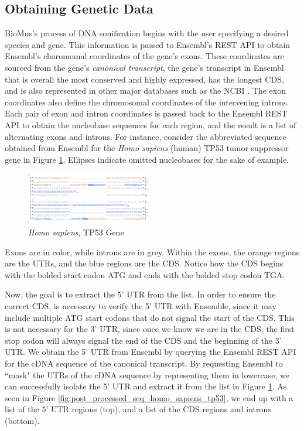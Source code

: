 \documentclass[letterpaper]{article}
\begin{document}
\subsection{Obtaining Genetic Data}
BioMus's process of DNA sonification begins with the user specifying a desired species and gene. This information is passed to Ensembl's REST API to obtain Ensembl's choromomal coordinates of the gene's exons. These coordinates are sourced from the gene's \textit{canonical transcript}, the gene's transcript in Ensembl that is overall the most conserved and highly expressed, has the longest CDS, and is also represented in other major databases such as the NCBI \cite{ensembl_transcript_flags}. The exon coordinates also define the chromosomal coordinates of the intervening introns. Each pair of exon and intron coordinates is passed back to the Ensembl REST API to obtain the nucleobase sequences for each region, and the result is a list of alternating exons and introns. For instance, consider the abbreviated sequence obtained from Ensembl for the \textit{Homo sapiens} (human) TP53 tumor suppressor gene in Figure \ref{fig:pre_processed_seq_homo_sapiens_tp53}. Ellipses indicate omitted nucleobases for the sake of example.

\begin{figure}[h!]
\centering
\includegraphics[width=0.48\textwidth]{images/pre_processed_seq_homo_sapiens_tp53_ABBREV}
  \caption{\textit{Homo sapiens}, TP53 Gene}\label{fig:pre_processed_seq_homo_sapiens_tp53}
  \vspace{-3mm}
\end{figure}

Exons are in color, while introns are in grey. Within the exons, the orange regions are the UTRs, and the blue regions are the CDS. Notice how the CDS begins with the bolded start codon ATG and ends with the bolded stop codon TGA. 

Now, the goal is to extract the 5' UTR from the list. In order to ensure the correct CDS, is necessary to verify the 5' UTR with Ensemble, since it may include multiple ATG start codons that do not signal the start of the CDS. This is not necessary for the 3' UTR, since once we know we are in the CDS, the first stop codon will always signal the end of the CDS and the beginning of the 3' UTR. We obtain the 5' UTR from Ensembl by querying the Ensembl REST API for the cDNA sequence of the canonical transcript. By requesting Ensembl to ``mask" the UTRs of the cDNA sequence by representing them in lowercase, we can successfully isolate the 5' UTR and extract it from the list in Figure \ref{fig:pre_processed_seq_homo_sapiens_tp53}. As seen in Figure \ref{fig:post_processed_seq_homo_sapiens_tp53}, we end up with a list of the 5' UTR regions (top), and a list of the CDS regions and introns (bottom).\cite{10.1162/artl_a_00325}
\end{document}
